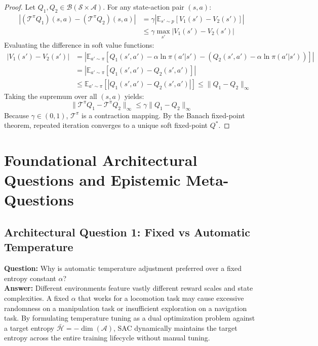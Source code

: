 \documentclass[11pt,a4paper]{article}
\theoremstyle{definition}
\begin{document}
\begin{proof}
Let $Q_1, Q_2 \in \mathcal{B}(\mathcal{S} \times \mathcal{A})$. For any state-action pair $(s, a)$:
{\boldmath
\begin{align}
|(\mathcal{T}^\pi Q_1)(s, a) - (\mathcal{T}^\pi Q_2)(s, a)| &= \gamma \left| \mathbb{E}_{s' \sim p} \left[ V_1(s') - V_2(s') \right] \right| \\
&\le \gamma \max_{s'} |V_1(s') - V_2(s')|
\end{align}
}
Evaluating the difference in soft value functions:
{\boldmath
\begin{align}
|V_1(s') - V_2(s')| &= \left| \mathbb{E}_{a' \sim \pi} \left[ Q_1(s', a') - \alpha \ln \pi(a'|s') - (Q_2(s', a') - \alpha \ln \pi(a'|s')) \right] \right| \\
&= \left| \mathbb{E}_{a' \sim \pi} \left[ Q_1(s', a') - Q_2(s', a') \right] \right| \\
&\le \mathbb{E}_{a' \sim \pi} \left[ |Q_1(s', a') - Q_2(s', a')| \right] \le \|Q_1 - Q_2\|_\infty
\end{align}
}
Taking the supremum over all $(s, a)$ yields:
{\boldmath
\begin{equation}
\|\mathcal{T}^\pi Q_1 - \mathcal{T}^\pi Q_2\|_\infty \le \gamma \|Q_1 - Q_2\|_\infty
\end{equation}
}
Because $\gamma \in (0, 1)$, $\mathcal{T}^\pi$ is a contraction mapping. By the Banach fixed-point theorem, repeated iteration converges to a unique soft fixed-point $Q^*$.
\end{proof}

\section{Foundational Architectural Questions and Epistemic Meta-Questions}

\subsection{Architectural Question 1: Fixed vs Automatic Temperature}
\textbf{Question:} Why is automatic temperature adjustment preferred over a fixed entropy constant $\alpha$?\\
\textbf{Answer:} Different environments feature vastly different reward scales and state complexities. A fixed $\alpha$ that works for a locomotion task may cause excessive randomness on a manipulation task or insufficient exploration on a navigation task. By formulating temperature tuning as a dual optimization problem against a target entropy $\bar{\mathcal{H}} = -\dim(\mathcal{A})$, SAC dynamically maintains the target entropy across the entire training lifecycle without manual tuning.
\end{document}

